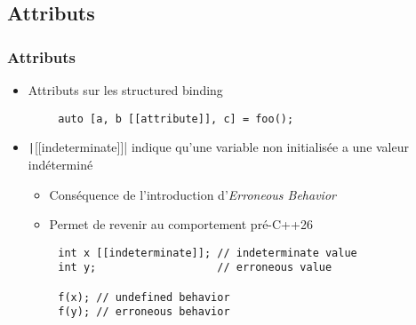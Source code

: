 \documentclass[C++.tex]{subfiles}
\begin{document}
\subsection*{Attributs}
\begin{frame}[fragile]
	\frametitle{Attributs}
	\begin{itemize}
		\item Attributs sur les structured binding
	\end{itemize}

	\begin{verbatim}
		auto [a, b [[attribute]], c] = foo();
	\end{verbatim}

	\begin{itemize}
		\item \texttt|[[indeterminate]]| indique qu'une variable non initialisée a une valeur indéterminé
		\begin{itemize}
			\item Conséquence de l'introduction d'\textit{Erroneous Behavior}
			\item Permet de revenir au comportement pré-C++26
		\end{itemize}
	\end{itemize}

	\begin{verbatim}
		int x [[indeterminate]]; // indeterminate value
		int y;                   // erroneous value

		f(x); // undefined behavior
		f(y); // erroneous behavior
	\end{verbatim}

\end{frame}
\end{document}
